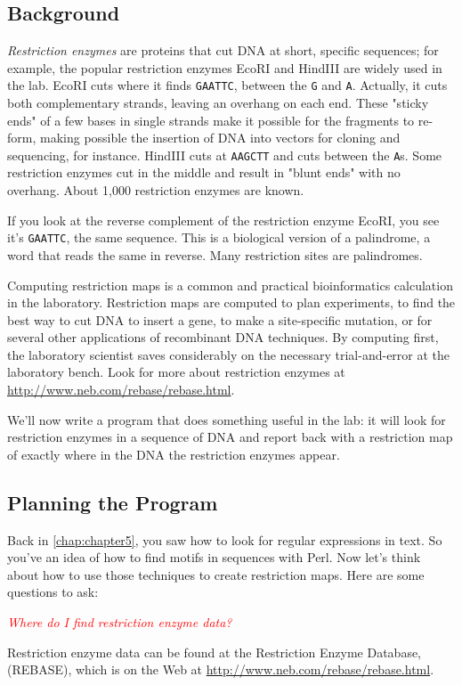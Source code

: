 \subsection{Background}
\textit{Restriction enzymes} are proteins that cut DNA at short, specific sequences; for example, the popular restriction enzymes EcoRI and HindIII are widely used in the lab. EcoRI cuts where it finds \verb|GAATTC|, between the \verb|G| and \verb|A|. Actually, it cuts both complementary strands, leaving an overhang on each end. These "sticky ends" of a few bases in single strands make it possible for the fragments to re-form, making possible the insertion of DNA into vectors for cloning and sequencing, for instance. HindIII cuts at \verb|AAGCTT| and cuts between the \verb|A|s. Some restriction enzymes cut in the middle and result in "blunt ends" with no overhang. About 1,000 restriction enzymes are known. 

If you look at the reverse complement of the restriction enzyme EcoRI, you see it's \verb|GAATTC|, the same sequence. This is a biological version of a palindrome, a word that reads the same in reverse. Many restriction sites are palindromes.

Computing restriction maps is a common and practical bioinformatics calculation in the laboratory. Restriction maps are computed to plan experiments, to find the best way to cut DNA to insert a gene, to make a site-specific mutation, or for several other applications of recombinant DNA techniques. By computing first, the laboratory scientist saves considerably on the necessary trial-and-error at the laboratory bench. Look for more about restriction enzymes at \href{http://www.neb.com/rebase/rebase.html}{http://www.neb.com/rebase/rebase.html}.

We'll now write a program that does something useful in the lab: it will look for restriction enzymes in a sequence of DNA and report back with a restriction map of exactly where in the DNA the restriction enzymes appear. 

\subsection{Planning the Program}
Back in \autoref{chap:chapter5}, you saw how to look for regular expressions in text. So you've an idea of how to find motifs in sequences with Perl. Now let's think about how to use those techniques to create restriction maps. Here are some questions to ask:

\textcolor{red}{\textit{Where do I find restriction enzyme data?}}
\begin{adjustwidth}{2em}{}
Restriction enzyme data can be found at the Restriction Enzyme Database, (REBASE), which is on the Web at \href{http://www.neb.com/rebase/rebase.html}{http://www.neb.com/rebase/rebase.html}.
\end{adjustwidth}

